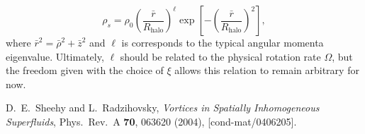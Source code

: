 \documentclass[onecolumn,nofootinbib,superscriptaddress]{revtex4}
\begin{document}
\begin{equation}
\rho_s = \rho_0 \left(\frac{\bar{r}}{R_\text{halo}}\right)^\ell \exp\left[-\left(\frac{\bar{r}}{R_\text{halo}}\right)^2\right],
\end{equation}
where $\bar{r}^2 = \bar{\rho}^2+\bar{z}^2$ and $\ell$ is corresponds to the typical angular momenta eigenvalue.  Ultimately, $\ell$ should be related to the physical rotation rate $\Omega$, but the freedom given with the choice of $\xi$ allows this relation to remain arbitrary for now.




\begin{thebibliography}{99}
  
  D.~E.~Sheehy and L.~Radzihovsky,
  \emph{Vortices in Spatially Inhomogeneous Superfluids},
  Phys.\ Rev.\ A {\bf 70}, 063620 (2004),
  [cond-mat/0406205].

\end{thebibliography}
\end{document}
